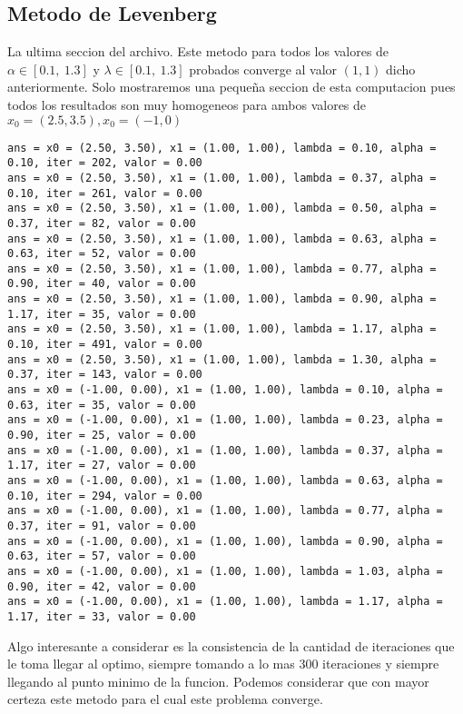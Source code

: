 \documentclass[letterpaper]{article}
\begin{document}
\subsection*{Metodo de Levenberg}
La ultima seccion del archivo. Este metodo para todos los valores de
\(\alpha \in [0.1,\ 1.3]\) y \(\lambda \in [0.1,\ 1.3]\) probados
converge al valor \((1,1)\) dicho anteriormente. Solo mostraremos una
pequeña seccion de esta computacion pues todos los resultados son muy
homogeneos para ambos valores de \(x_0 = (2.5, 3.5), x_0 = (-1,0)\)
\begin{verbatim}
ans = x0 = (2.50, 3.50), x1 = (1.00, 1.00), lambda = 0.10, alpha = 0.10, iter = 202, valor = 0.00
ans = x0 = (2.50, 3.50), x1 = (1.00, 1.00), lambda = 0.37, alpha = 0.10, iter = 261, valor = 0.00
ans = x0 = (2.50, 3.50), x1 = (1.00, 1.00), lambda = 0.50, alpha = 0.37, iter = 82, valor = 0.00
ans = x0 = (2.50, 3.50), x1 = (1.00, 1.00), lambda = 0.63, alpha = 0.63, iter = 52, valor = 0.00
ans = x0 = (2.50, 3.50), x1 = (1.00, 1.00), lambda = 0.77, alpha = 0.90, iter = 40, valor = 0.00
ans = x0 = (2.50, 3.50), x1 = (1.00, 1.00), lambda = 0.90, alpha = 1.17, iter = 35, valor = 0.00
ans = x0 = (2.50, 3.50), x1 = (1.00, 1.00), lambda = 1.17, alpha = 0.10, iter = 491, valor = 0.00
ans = x0 = (2.50, 3.50), x1 = (1.00, 1.00), lambda = 1.30, alpha = 0.37, iter = 143, valor = 0.00
ans = x0 = (-1.00, 0.00), x1 = (1.00, 1.00), lambda = 0.10, alpha = 0.63, iter = 35, valor = 0.00
ans = x0 = (-1.00, 0.00), x1 = (1.00, 1.00), lambda = 0.23, alpha = 0.90, iter = 25, valor = 0.00
ans = x0 = (-1.00, 0.00), x1 = (1.00, 1.00), lambda = 0.37, alpha = 1.17, iter = 27, valor = 0.00
ans = x0 = (-1.00, 0.00), x1 = (1.00, 1.00), lambda = 0.63, alpha = 0.10, iter = 294, valor = 0.00
ans = x0 = (-1.00, 0.00), x1 = (1.00, 1.00), lambda = 0.77, alpha = 0.37, iter = 91, valor = 0.00
ans = x0 = (-1.00, 0.00), x1 = (1.00, 1.00), lambda = 0.90, alpha = 0.63, iter = 57, valor = 0.00
ans = x0 = (-1.00, 0.00), x1 = (1.00, 1.00), lambda = 1.03, alpha = 0.90, iter = 42, valor = 0.00
ans = x0 = (-1.00, 0.00), x1 = (1.00, 1.00), lambda = 1.17, alpha = 1.17, iter = 33, valor = 0.00
\end{verbatim}
Algo interesante a considerar es la consistencia de la cantidad de
iteraciones que le toma llegar al optimo, siempre tomando a lo mas 300
iteraciones y siempre llegando al punto minimo de la funcion. Podemos
considerar que con mayor certeza este metodo para el cual este problema
converge.
\end{document}
